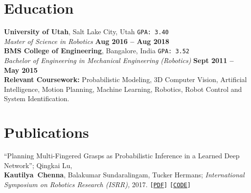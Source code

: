 \documentclass[letterpaper, margin, line, 10.5pt]{resume}
\begin{document}
\begin{resume}
    \section{\myheadingstyle Education}
    \textbf{University of Utah}, Salt Lake City, Utah \hfill \texttt{GPA: 3.40}
    \\\vspace{1mm}%
    \textsl{Master of Science in Robotics} \hfill \textbf{ Aug 2016 -- Aug 2018}\\%
    \textbf{BMS College of Engineering}, Bangalore, India \hfill \texttt{GPA: 3.52}
    \\\vspace{1mm}%
    \textsl{Bachelor of Engineering in Mechanical Engineering (Robotics)} \hfill \textbf{Sept 2011 -- May 2015}\\%
	\textbf{Relevant Coursework:} Probabilistic Modeling, 3D Computer Vision, Artificial Intelligence, Motion Planning, Machine Learning, Robotics, Robot Control and System Identification.

    


    
    \sectionseperator
    \section{\myheadingstyle Publications}
     ``Planning Multi-Fingered Grasps as Probabilistic Inference in a Learned Deep Network''; Qingkai Lu, \\
     \mbox{\bf Kautilya Chenna}, Balakumar Sundaralingam, Tucker Hermans; \textit{International Symposium on Robotics Research (ISRR),} 2017. \texttt{[\href{http://www.cs.utah.edu/~thermans/papers/lu-isrr2017-deep-multifinger-grasping.pdf}{PDF}]} \texttt{[\href{https://robot-learning.cs.utah.edu/project/grasp\_inference}{CODE}]}%



\end{resume}
\end{document}
